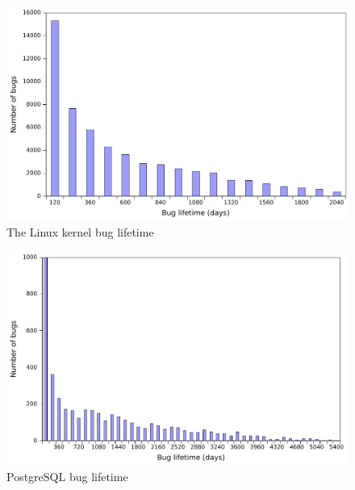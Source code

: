 \begin{figure}
\begin{center}
\includegraphics[width=\columnwidth]{linux-bug-lifetime.pdf}
\end{center}
\caption{The Linux kernel bug lifetime}
\label{fig-linux-bug-lifetime}
\end{figure}

\begin{figure}
\begin{center}
\includegraphics[width=\columnwidth]{postgresql-bug-lifetime.pdf}
\end{center}
\caption{PostgreSQL bug lifetime}
\label{fig-postgresql-bug-lifetime}
\end{figure}


